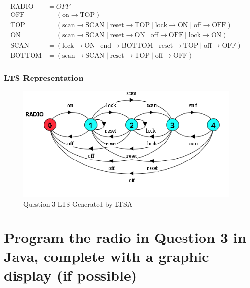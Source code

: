 \documentclass{article}[8pt]
\renewcommand{\thesubsubsection}{\thesection.\alph{subsection}.\Roman{subsubsection}}
\begin{document}
\begin{align*}
	\text{RADIO} &= OFF \\
	\text{OFF} &= (\text{on} \rightarrow \text{TOP}) \\
	\text{TOP} &= (\text{scan} \rightarrow \text{SCAN}\; | \; \text{reset} \rightarrow \text{TOP} \; | \; \text{lock} \rightarrow \text{ON} \; | \; \text{off} \rightarrow \text{OFF}) \\
	\text{ON} &= (\text{scan} \rightarrow \text{SCAN} \; | \; \text{reset} \rightarrow \text{ON} \; | \;\text{off} \rightarrow \text{OFF} \; | \; \text{lock} \rightarrow \text{ON}) \\
	\text{SCAN} &= (\text{lock} \rightarrow \text{ON} \; | \; \text{end} \rightarrow \text{BOTTOM} \; | \; \text{reset} \rightarrow \text{TOP} \; | \; \text{off} \rightarrow \text{OFF}) \\
	\text{BOTTOM} &= (\text{scan} \rightarrow \text{SCAN} \; | \; \text{reset} \rightarrow \text{TOP} \; | \; \text{off} \rightarrow \text{OFF})
\end{align*}

\subsubsection[~\thesubsubsection]{LTS Representation}

\begin{figure}[H]
	\includegraphics{./imgs/Question-3.png}
	\caption{Question 3 LTS Generated by LTSA}
	\label{fig:Question-2-b-iii-LTS}
\end{figure}

\section[Question ~\thesection]{Program the radio in Question 3 in Java, complete with a graphic display (if possible)}
\end{document}
